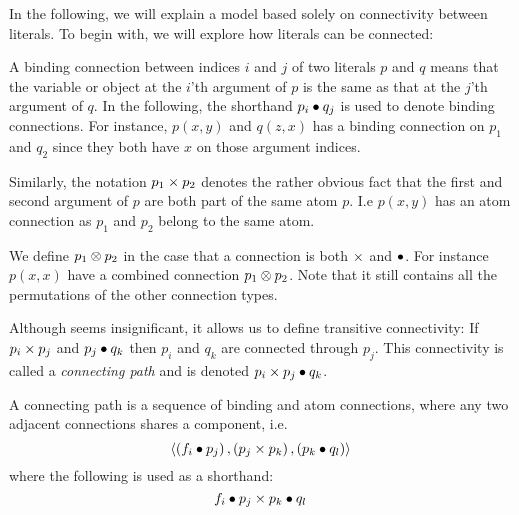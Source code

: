 \documentclass[\master/Master.tex]{subfiles}
\begin{document}
In the following, we will explain a model based solely on connectivity between literals. To begin with, we will explore how literals can be connected:

\begin{definition}\label{def:ca:bindingConn}
    A binding connection between indices $i$ and $j$ of two literals $p$ and $q$ means that the variable or object at the $i$'th argument of $p$ is the same as that at the $j$'th argument of $q$. In the following, the shorthand $p_i \bullet q_j$ is used to denote binding connections.
    For instance, $p(x,y)$ and $q(z,x)$ has a binding connection on $p_1$ and $q_2$ since they both have $x$ on those argument indices.
    
\end{definition}

\begin{definition}\label{def:ca:predicateConn}
    Similarly, the notation $p_1 \times p_2$ denotes the rather obvious fact that the first and second argument of $p$ are both part of the same atom $p$. I.e $p(x,y)$ has an atom connection as $p_1$ and $p_2$ belong to the same atom.
\end{definition}

\begin{definition}\label{def:ca:combinedConn}
	We define $p_1 \otimes p_2$ in the case that a connection is both $\times$ and $\bullet$.
	For instance $p(x,x)$ have a combined connection $p_1 \otimes p_2$. Note that it still contains all the permutations of the other connection types.
\end{definition}

Although  seems insignificant, it allows us to define transitive connectivity: If $p_i \times p_j$ and $p_j \bullet q_k$ then $p_i$ and $q_k$ are connected through $p_j$. This connectivity is called a \emph{connecting path} and is denoted $p_i \times p_j \bullet q_k$.

\begin{definition}\label{def:ca:connectingPath}
    A connecting path is a sequence of binding and atom connections, where any two adjacent connections shares a component, i.e.\
    \begin{equation*}
        \left< 
            \left( f_i \bullet p_j \right), 
            \left( p_j \times p_k \right), 
            \left( p_k \bullet q_l \right) 
        \right>
    \end{equation*}
    where the following is used as a shorthand:
    \begin{equation*}
        f_i \bullet p_j \times p_k \bullet q_l
    \end{equation*}
\end{definition}
\end{document}
